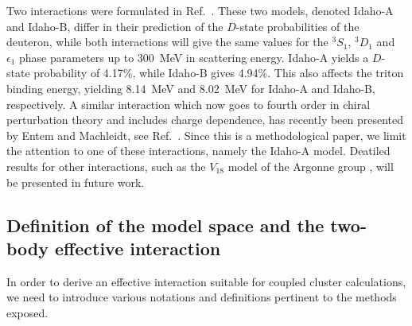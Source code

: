 \documentclass[aps,prc,twocolumn,floatfix]{revtex4}
\begin{document}
Two interactions were formulated in Ref.~\cite{machleidt02}. These two 
models, denoted Idaho-A and Idaho-B, differ in their prediction of the
$D$-state probabilities of the deuteron, while both interactions will 
give the same values for the $^3S_1$, $^3D_1$ and $\epsilon_1$ phase 
parameters up to 300~MeV in scattering energy. Idaho-A yields a $D$-state
probability of 4.17\%, while Idaho-B gives 4.94\%. This also affects
the triton binding energy, yielding 8.14~MeV and 8.02~MeV for Idaho-A
and Idaho-B, respectively. 
A similar interaction which now goes to  
fourth order in chiral perturbation theory and includes charge dependence,  
has recently been presented by Entem and Machleidt, see Ref.~\cite{machleidt03}.
Since this is a methodological paper, we limit the attention to one of 
these interactions, namely the Idaho-A model. Deatiled results 
for other interactions, such as
the $V_{18}$ model of the Argonne group \cite{bob95}, 
will be presented in future work. 


\subsection{Definition of the model space and the two-body effective interaction}

In order to derive an effective interaction suitable for coupled
cluster calculations, we need to introduce various
notations and definitions pertinent to the methods exposed.
\end{document}
